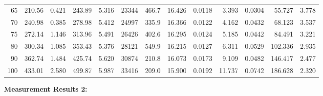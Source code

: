 \documentclass[10pt]{article}
\begin{document}
{\begin{tabular}{|r|rr|rr|rr|rr|rr|r|r|}
       65 &       210.56 &        0.421 &       243.89 &        5.316 &        23344 &        466.7 &       16.426 &       0.0118 &        3.393 &       0.0304 &       55.727 &        3.778 \\
       70 &       240.98 &        0.385 &       278.98 &        5.412 &        24997 &        335.9 &       16.366 &       0.0122 &        4.162 &       0.0432 &       68.123 &        3.537 \\
       75 &       272.14 &        1.146 &       313.96 &        5.491 &        26426 &        402.6 &       16.295 &       0.0124 &        5.185 &       0.0442 &       84.491 &        3.221 \\
       80 &       300.34 &        1.085 &       353.43 &        5.376 &        28121 &        549.9 &       16.215 &       0.0127 &        6.311 &       0.0529 &      102.336 &        2.935 \\
       90 &       362.74 &        1.484 &       425.74 &        5.620 &        30874 &        210.8 &       16.073 &       0.0173 &        9.109 &       0.0482 &      146.417 &        2.477 \\
      100 &       433.01 &        2.580 &       499.87 &        5.987 &        33416 &        209.0 &       15.900 &       0.0192 &       11.737 &       0.0742 &      186.628 &        2.320 \\
\hline
\end{tabular}
}

\vspace{3mm}

\noindent
{\large \bf Measurement Results 2:}
\vspace{3mm}
\end{document}

